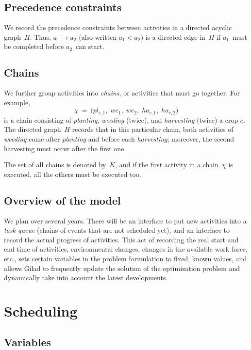 \documentclass[11pt,reqno]{amsart}
\newcommand{\lra}{\longrightarrow}
\numberwithin{equation}{section}
\begin{document}
\subsection{Precedence constraints}

We record the precedence constraints between  activities in a directed acyclic
graph~$H$. Thus, $a_1\lra a_2$ (also written $a_1<a_2$) is a directed edge
in~$H$ if $a_1$~must be completed before $a_2$~can start. 

\subsection{Chains}
We further group activities into \emph{chains}, or activities that must go
together. For example,
\[
   \chi
   \ = \
   \big(pl_{c,1}, \;
    we_{1},\;
    we_{2},\;
    ha_{c,1},\;
    ha_{c,2}\big)
\]
is a chain consisting of \emph{planting}, \emph{weeding} (twice), and \emph{harvesting}
(twice) a crop $c$. The directed graph~$H$ records that in this particular chain, both
activities of \emph{weeding} come after \emph{planting} and before each \emph{harvesting};
moreover, the second harvesting must occur after the first one.

The set of all chains is denoted by~$K$, and if the first activity in a chain~$\chi$ is
executed, all the others must be executed too.



\subsection{Overview of the model}

We plan over several years. There will be an interface to put new activities into a
\emph{task queue} (chains of events that are not scheduled yet), and an interface to
record the actual progress of activities. This act of recording the real start and end
time of activities, environmental changes, changes in the available work force, etc., sets
certain variables in the problem formulation to fixed, known values, and allows Gilad to
frequently update the solution of the optimization problem and dynamically take into
account the latest developments.

\section{Scheduling}

\subsection{Variables}
\end{document}
